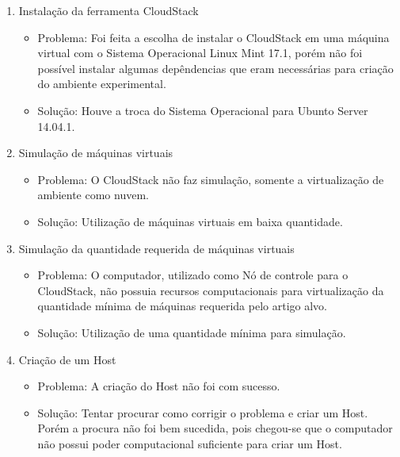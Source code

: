 \begin{enumerate}

  \item Instalação da ferramenta CloudStack

  \begin{itemize}
    \item Problema: Foi feita a escolha de instalar o CloudStack em uma máquina virtual com o Sistema Operacional Linux Mint 17.1, porém não foi possível instalar algumas depêndencias que eram necessárias para criação do ambiente experimental.
    \item Solução: Houve a troca do Sistema Operacional para Ubunto Server 14.04.1.
  \end{itemize}

  \item Simulação de máquinas virtuais
  \begin{itemize}
    \item Problema: O CloudStack não faz simulação, somente a virtualização de ambiente como nuvem.
    \item Solução: Utilização de máquinas virtuais em baixa quantidade.
  \end{itemize}

  \item Simulação da quantidade requerida de máquinas virtuais
  \begin{itemize}
    \item Problema: O computador, utilizado como Nó de controle para o CloudStack, não possuia recursos computacionais para virtualização da quantidade mínima de máquinas requerida pelo artigo alvo.
    \item Solução: Utilização de uma quantidade mínima para simulação.
  \end{itemize}

  \item Criação de um Host
  \begin{itemize}
    \item Problema: A criação do Host não foi com sucesso.
    \item Solução: Tentar procurar como corrigir o problema e criar um Host. Porém a procura não foi bem sucedida, pois chegou-se que o computador não possui poder computacional suficiente para criar um Host.
  \end{itemize}

\end{enumerate}


\begin{comment}

  \item Instalação da ferramenta CloudStack
  \begin{itemize}
    \item Problema:
    \item Solução:
  \end{itemize}


\end{comment}
